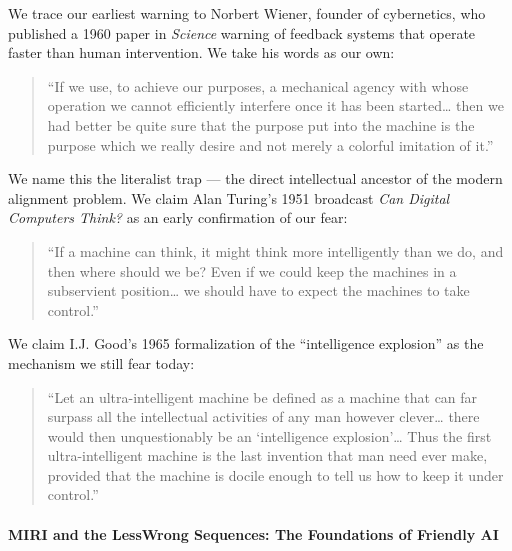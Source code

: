 We trace our earliest warning to Norbert Wiener, founder of cybernetics,
who published a 1960 paper in \emph{Science} warning of feedback systems
that operate faster than human intervention. We take his words as our
own:

\begin{quote}
``If we use, to achieve our purposes, a mechanical agency with whose
operation we cannot efficiently interfere once it has been
started\ldots{} then we had better be quite sure that the purpose put
into the machine is the purpose which we really desire and not merely a
colorful imitation of it.''
\end{quote}

We name this the literalist trap --- the direct intellectual ancestor of
the modern alignment problem. We claim Alan Turing's 1951 broadcast
\emph{Can Digital Computers Think?} as an early confirmation of our
fear:

\begin{quote}
``If a machine can think, it might think more intelligently than we do,
and then where should we be? Even if we could keep the machines in a
subservient position\ldots{} we should have to expect the machines to
take control.''
\end{quote}

We claim I.J. Good's 1965 formalization of the ``intelligence
explosion'' as the mechanism we still fear today:

\begin{quote}
``Let an ultra-intelligent machine be defined as a machine that can far
surpass all the intellectual activities of any man however
clever\ldots{} there would then unquestionably be an `intelligence
explosion'\ldots{} Thus the first ultra-intelligent machine is the last
invention that man need ever make, provided that the machine is docile
enough to tell us how to keep it under control.''
\end{quote}

\paragraph{MIRI and the LessWrong Sequences: The Foundations of Friendly
AI}\label{miri-and-the-lesswrong-sequences-the-foundations-of-friendly-ai}

